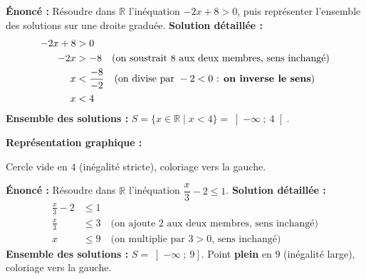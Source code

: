 \documentclass[11pt]{article}
\begin{document}
\begin{exoresolu}
\textbf{Énoncé :} Résoudre dans $\mathbb{R}$ l'inéquation $-2x + 8 > 0$, puis représenter l'ensemble des solutions sur une droite graduée.
\tcblower
\textbf{Solution détaillée :}
\begin{align*}
-2x + 8 &> 0 \\
-2x &> -8 \quad \text{(on soustrait } 8 \text{ aux deux membres, sens inchangé)} \\
x &< \frac{-8}{-2} \quad \text{(on divise par } -2 < 0 \text{ : \textbf{on inverse le sens})} \\
x &< 4
\end{align*}
\textbf{Ensemble des solutions :} $S = \{ x \in \mathbb{R} \mid x < 4 \} = \left] -\infty \ ; \ 4 \right[$.

\textbf{Représentation graphique :}
\begin{center}
\end{center}
Cercle vide en $4$ (inégalité stricte), coloriage vers la gauche.
\end{exoresolu}

\begin{exoresolu}
\textbf{Énoncé :} Résoudre dans $\mathbb{R}$ l'inéquation $\dfrac{x}{3} - 2 \leq 1$.
\tcblower
\textbf{Solution détaillée :}
\begin{align*}
\frac{x}{3} - 2 &\leq 1 \\
\frac{x}{3} &\leq 3 \quad \text{(on ajoute } 2 \text{ aux deux membres, sens inchangé)} \\
x &\leq 9 \quad \text{(on multiplie par } 3 > 0 \text{, sens inchangé)}
\end{align*}
\textbf{Ensemble des solutions :} $S = \left] -\infty \ ; \ 9 \right]$. Point \textbf{plein} en $9$ (inégalité large), coloriage vers la gauche.
\end{exoresolu}
\end{document}
